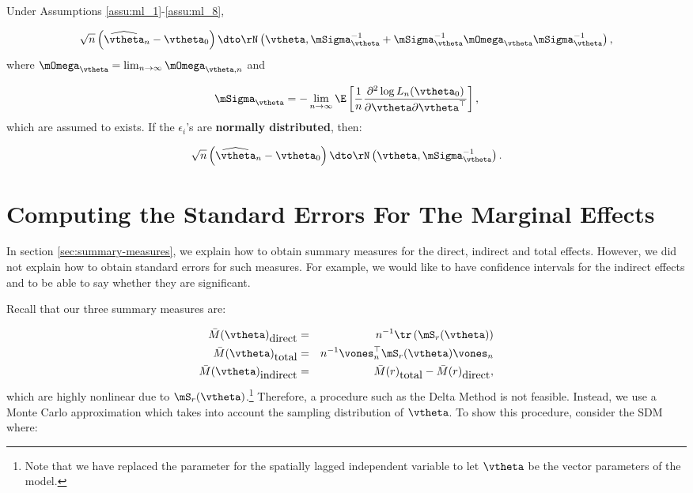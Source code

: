 \begin{theorem}
Under Assumptions \ref{assu:ml_1}-\ref{assu:ml_8}, 

\begin{equation}
  \sqrt{n}\left(\widehat{\vtheta}_n- \vtheta_0\right)\dto \rN\left(\vtheta, \mSigma_{\vtheta}^{-1} + \mSigma_{\vtheta}^{-1}\mOmega_{\vtheta}\mSigma_{\vtheta}^{-1}\right),
\end{equation}
%
where $\mOmega_{\vtheta} = \lim_{n\to\infty}\mOmega_{\vtheta, n}$ and

\begin{equation}
  \mSigma_{\vtheta}= - \lim_{n\to\infty} \E\left[\frac{1}{n}\frac{\partial^2 \log L_n(\vtheta_0)}{\partial \vtheta \partial \vtheta^\top}\right],
\end{equation}
which are assumed to exists. If the $\epsilon_i$'s are \textbf{normally distributed}, then:

\begin{equation}
  \sqrt{n}\left(\widehat{\vtheta}_n- \vtheta_0\right)\dto \rN\left(\vtheta, \mSigma_{\vtheta}^{-1}\right).
\end{equation}
\end{theorem}

\section{Computing the Standard Errors For The Marginal Effects}

In section \ref{sec:summary-measures}, we explain how to obtain summary measures for the direct, indirect and total effects. However, we did not explain how to obtain standard errors for such measures. For example, we would like to have confidence intervals for the indirect effects and to be able to say whether they are significant. 

Recall that our three summary measures are:

\begin{eqnarray*}
\bar{M}(\vtheta)_{\mbox{direct}} & = & n^{-1}\tr\left(\mS_r(\vtheta)\right) \\
\bar{M}(\vtheta)_{\mbox{total}} & = & n^{-1}\vones_n^\top\mS_r(\vtheta)\vones_n \\
\bar{M}(\vtheta)_{\mbox{indirect}} & = & \bar{M}(r)_{\mbox{total}} - \bar{M}(r)_{\mbox{direct}},
\end{eqnarray*}
%
which are highly nonlinear due to $\mS_r(\vtheta)$.\footnote{Note that we have replaced the parameter for the spatially lagged independent variable to let $\vtheta$ be the vector parameters of the model. } Therefore, a procedure such as the Delta Method is not feasible. Instead, we use a Monte Carlo approximation which takes into account the sampling distribution of $\vtheta$. To show this procedure, consider the SDM where:

